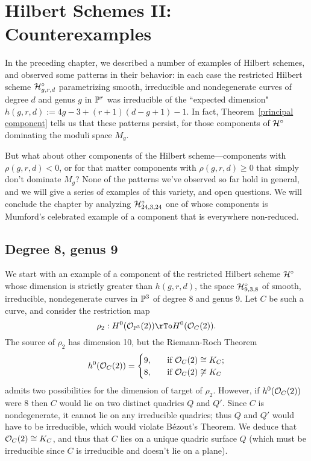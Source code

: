 
\chapter{Hilbert Schemes II: Counterexamples} 
\label{HilbertSchemesCounterexamplesChapter}


In the preceding chapter, we described a number of examples of Hilbert schemes, and observed some patterns in their behavior: in each case the restricted Hilbert scheme $\cH^\circ_{g,r,d}$ parametrizing smooth, irreducible and nondegenerate curves of degree $d$ and genus $g$ in $\PP^r$ was irreducible of the ``expected dimension" $h(g,r,d) :=  4g-3 + (r+1)(d-g+1) - 1$. In fact, Theorem~\ref{principal component} tells us that these patterns persist, for those components of $\cH^\circ$ dominating the moduli space $M_g$.

But what about other components of the Hilbert scheme---components with $\rho(g,r,d) < 0$, or for that matter components with $\rho(g,r,d) \geq 0$ that simply don't dominate $M_g$? None of the patterns we've observed so far hold in general, and we will give a series of examples of this variety, and open questions. We will conclude the chapter by analyzing $\cH^\circ_{24,3,24}$ one of whose components is Mumford's celebrated example of a component that is everywhere non-reduced.

\section{Degree 8, genus 9}\label{degree 8 section}

We start with an example of a component of the restricted Hilbert scheme $\cH^\circ$ whose dimension is strictly greater than $h(g,r,d)$, the space $\cH^\circ_{9,3,8}$ of smooth, irreducible, nondegenerate curves in $\PP^3$ of degree 8 and genus 9. Let $C$ be such a curve, and consider the restriction map
$$
\rho_2 : H^0(\cO_{\PP^3}(2)) \rTo H^0(\cO_C(2)).
$$
The source of $\rho_2$ has dimension 10, but the Riemann-Roch Theorem
\begin{align*}
h^0(\cO_C(2)) =
\begin{cases}
9, \quad &\text{if } \cO_C(2) \cong K_C; \\
8,  \quad &\text{if } \cO_C(2) \not\cong K_C
\end{cases}
\end{align*}
admits two possibilities for the dimension of target of $\rho_2$.
However, if $h^0(\cO_C(2))$ were 8 then $C$ would  lie on two distinct quadrics $Q$ and $Q'$. Since $C$ is nondegenerate, it cannot lie on any irreducible quadrics; thus $Q$ and $Q'$ would have to be irreducible, which would violate B\'ezout's Theorem. We deduce that $\cO_C(2) \cong K_C$, and thus that $C$ lies on a unique quadric surface $Q$ (which must be irreducible since $C$ is irreducible and doesn't lie on a plane).

